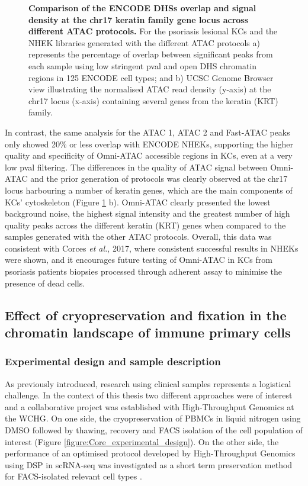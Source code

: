 \begin{figure}[htbp]
\begin{subfigure}{0.5\textwidth}
\caption{\textbf{}}
\end{subfigure}
\caption[Comparison of the ENCODE DHSs overlap and signal density at the chr17 keratin family gene locus across different ATAC protocols.]{\textbf{Comparison of the ENCODE DHSs overlap and signal density at the chr17 keratin family gene locus across different ATAC protocols.} For the psoriasis lesional KCs and the NHEK libraries generated with the different ATAC protocols a) represents the percentage of overlap between significant peaks from each sample using low stringent pval and open DHS chromatin regions in 125 ENCODE cell types; and  b) UCSC Genome Browser view illustrating the normalised ATAC read density (y-axis) at the chr17 locus (x-axis) containing several genes from the keratin (KRT) family.}
\label{figure:ATAC_skin_ENCODE_overlap_and_tracks}
\end{figure} 

In contrast, the same analysis for the ATAC 1, ATAC 2 and Fast-ATAC peaks only showed 20\% or less overlap with ENCODE NHEKs, supporting the higher quality and specificity of Omni-ATAC accessible regions in KCs, even at a very low pval filtering. The differences in the quality of ATAC signal between Omni-ATAC and the prior generation of protocols was clearly observed at the chr17 locus harbouring a number of keratin genes, which are the main components of KCs' cytoskeleton (Figure \ref{figure:ATAC_skin_ENCODE_overlap_and_tracks} b). Omni-ATAC clearly presented the lowest background noise, the highest signal intensity and the greatest number of high quality peaks across the different keratin (KRT) genes when compared to the samples generated with the other ATAC protocols. Overall, this data was consistent with Corces \textit{et al.}, 2017, where consistent successful results in NHEKs were shown, and it encourages future testing of Omni-ATAC in KCs from psoriasis patients biopsies processed through adherent assay to minimise the presence of dead cells.


\subsection{Effect of cryopreservation and fixation in the chromatin landscape of immune primary cells}
\label{Core}
\subsubsection{Experimental design and sample description}
As previously introduced, research using clinical samples represents a logistical challenge. In the context of this thesis two different approaches were of interest and a collaborative project was established with High-Throughput Genomics at the WCHG. On one side, the cryopreservation of PBMCs in liquid nitrogen using DMSO followed by thawing, recovery and FACS isolation of the cell population of interest (Figure \ref{figure:Core_experimental_design}). On the other side, the performance of an optimised protocol developed by High-Throughput Genomics using DSP in scRNA-seq \parencite{Attar2018} was investigated as a short term preservation method for FACS-isolated relevant cell types .

